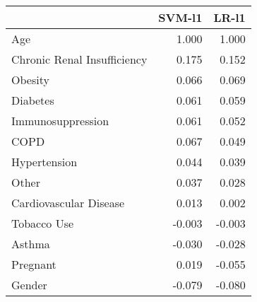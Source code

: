 \begin{tabular}{lrr}
\toprule
{} &  SVM-l1 &  LR-l1 \\
\midrule
Age                         &   1.000 &  1.000 \\
Chronic Renal Insufficiency &   0.175 &  0.152 \\
Obesity                     &   0.066 &  0.069 \\
Diabetes                    &   0.061 &  0.059 \\
Immunosuppression           &   0.061 &  0.052 \\
COPD                        &   0.067 &  0.049 \\
Hypertension                &   0.044 &  0.039 \\
Other                       &   0.037 &  0.028 \\
Cardiovascular Disease      &   0.013 &  0.002 \\
Tobacco Use                 &  -0.003 & -0.003 \\
Asthma                      &  -0.030 & -0.028 \\
Pregnant                    &   0.019 & -0.055 \\
Gender                      &  -0.079 & -0.080 \\
\bottomrule
\end{tabular}

